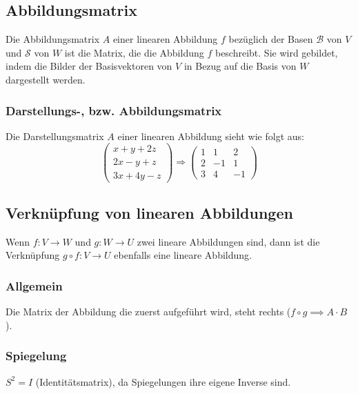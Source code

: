 \documentclass{article}
\begin{document}
\begin{minipage}[t]{0.45\textwidth}
    \subsection*{Abbildungsmatrix}
    Die Abbildungsmatrix \( A \) einer linearen Abbildung \( f \) bezüglich der Basen \( \mathcal{B} \) von \( V \) und \( \mathcal{S} \) von \( W \) ist die Matrix, 
    die die Abbildung \( f \) beschreibt. Sie wird gebildet, indem die Bilder der Basisvektoren von \( V \) in Bezug auf die Basis von \( W \) dargestellt werden.

    \subsubsection*{Darstellungs-, bzw. Abbildungsmatrix}
    Die Darstellungsmatrix \( A \) einer linearen Abbildung sieht wie folgt aus:
    \begin{equation*}
        \begin{pmatrix}
            x + y + 2z \\
            2x - y + z \\
            3x + 4y - z
        \end{pmatrix}
        \Rightarrow
        \begin{pmatrix}
            1 & 1 & 2 \\
            2 & -1 & 1 \\
            3 & 4 & -1
        \end{pmatrix}
    \end{equation*}
    \subsection*{Verknüpfung von linearen Abbildungen}
    Wenn \( f: V \to W \) und \( g: W \to U \) zwei lineare Abbildungen sind, dann ist die Verknüpfung \( g \circ f: V \to U \) ebenfalls eine lineare Abbildung.

    \subsubsection*{Allgemein}
    Die Matrix der Abbildung die zuerst aufgeführt wird, steht rechts ($f \circ g \implies A \cdot B$).

    \subsubsection*{Spiegelung}
    $S^2 = I$ (Identitätsmatrix), da Spiegelungen ihre eigene Inverse sind.


\end{minipage}
\end{document}
